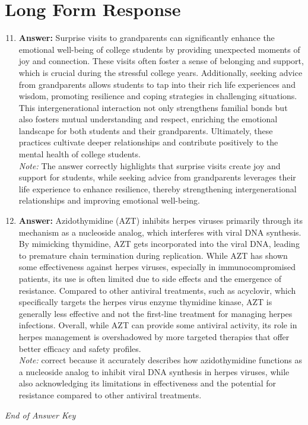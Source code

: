 \documentclass[12pt]{article}
\begin{document}
\section*{Long Form Response}
\begin{enumerate}[label=\arabic*.]
\setcounter{enumi}{10}
\item \textbf{Answer:} Surprise visits to grandparents can significantly enhance the emotional well-being of college students by providing unexpected moments of joy and connection. These visits often foster a sense of belonging and support, which is crucial during the stressful college years. Additionally, seeking advice from grandparents allows students to tap into their rich life experiences and wisdom, promoting resilience and coping strategies in challenging situations. This intergenerational interaction not only strengthens familial bonds but also fosters mutual understanding and respect, enriching the emotional landscape for both students and their grandparents. Ultimately, these practices cultivate deeper relationships and contribute positively to the mental health of college students.
\\ \textit{Note:} The answer correctly highlights that surprise visits create joy and support for students, while seeking advice from grandparents leverages their life experience to enhance resilience, thereby strengthening intergenerational relationships and improving emotional well-being.
\item \textbf{Answer:} Azidothymidine (AZT) inhibits herpes viruses primarily through its mechanism as a nucleoside analog, which interferes with viral DNA synthesis. By mimicking thymidine, AZT gets incorporated into the viral DNA, leading to premature chain termination during replication. While AZT has shown some effectiveness against herpes viruses, especially in immunocompromised patients, its use is often limited due to side effects and the emergence of resistance. Compared to other antiviral treatments, such as acyclovir, which specifically targets the herpes virus enzyme thymidine kinase, AZT is generally less effective and not the first-line treatment for managing herpes infections. Overall, while AZT can provide some antiviral activity, its role in herpes management is overshadowed by more targeted therapies that offer better efficacy and safety profiles.
\\ \textit{Note:} correct because it accurately describes how azidothymidine functions as a nucleoside analog to inhibit viral DNA synthesis in herpes viruses, while also acknowledging its limitations in effectiveness and the potential for resistance compared to other antiviral treatments.
\end{enumerate}

\vfill
\noindent\textit{End of Answer Key}
\end{document}
